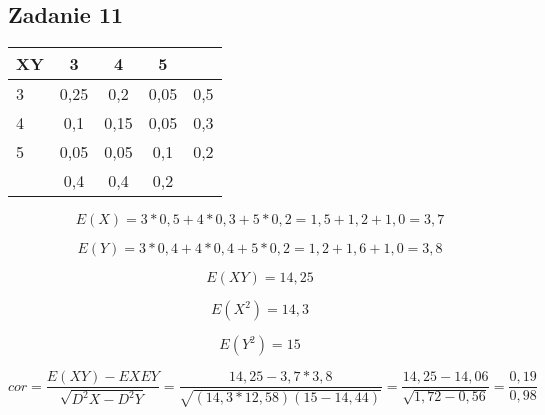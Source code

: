 \subsection{Zadanie 11}
\begin{table}
\centering
\begin{tabular}{|l|c|c|c|r|}
\hline
XY &3 &4 &5 & \\ \hline
3 &0,25 &0,2 &0,05 &0,5 \\ \hline
4 &0,1 &0,15 &0,05 &0,3\\ \hline
5 &0,05 &0,05 &0,1 &0,2\\ \hline
$ $ &0,4 &0,4 &0,2 & \\ \hline
\end{tabular}
\end{table}

$$E(X) = 3*0,5 + 4*0,3 + 5*0,2 = 1,5 + 1,2 + 1,0 = 3,7$$

$$E(Y) = 3*0,4 + 4*0,4 + 5*0,2 = 1,2 + 1,6 + 1,0 = 3,8$$

$$E(XY) = 14,25$$

$$E(X^2) = 14,3$$

$$E(Y^2) = 15$$

$$cor = \frac{E(XY) - EXEY}{\sqrt{D^2X - D^2Y}} = \frac{14,25 - 3,7*3,8}{\sqrt{(14,3*12,58)(15 - 14,44)}} = \frac{14,25 - 14,06}{\sqrt{1,72 - 0,56}} = \frac{0,19}{0,98}$$
